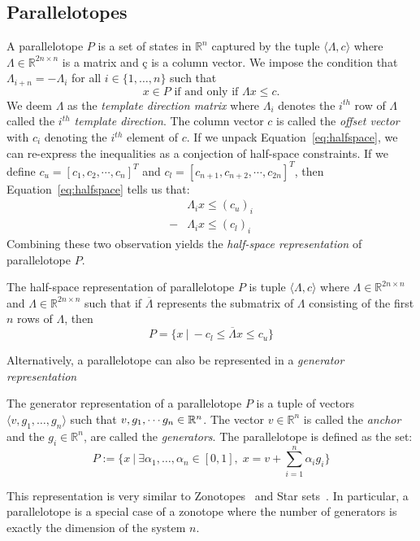 \subsection{Parallelotopes}
\label{sec:parallelotope}
A parallelotope $P$ is a set of states in $\mathbb{R}^{n}$ captured by the tuple $\langle \Lambda, c\rangle$ where $\Lambda \in \mathbb{R}^{2n \times n}$ is a matrix and $ç$ is a column vector. We impose the condition that $\Lambda_{i+n} = -\Lambda_{i}$ for all $i \in \{1, \ldots, n\}$ such that
%
\begin{equation}
\label{eq:halfspace}
x \in P \mbox{ if and only if } \Lambda x \leq c.
\end{equation}
We deem $\Lambda$ as the \emph{template direction matrix} where $\Lambda_i$ denotes the $i^{th}$ row of $\Lambda$ called the \emph{$i^{th}$ template direction}. The column vector $c$ is called the \emph{offset vector} with $c_i$ denoting the $i^{th}$ element of $c$.
%
If we unpack Equation~\ref{eq:halfspace}, we can re-express the inequalities as a conjection of half-space constraints. If we define $c_{u} = [c_1, c_2, \cdots, c_n]^T$ and $c_{l} = [c_{n+1}, c_{n+2}, \cdots, c_{2n}]^T$, then Equation~\ref{eq:halfspace} tells us that:
%
\begin{align*}
  & \Lambda_i x \leq (c_u)_i \\
  -& \Lambda_i x \leq (c_l)_i
\end{align*}
%
Combining these two observation yields the \emph{half-space representation} of parallelotope $P$.
%
\begin{definition}
The half-space representation of parallelotope $P$ is tuple  $\langle \Lambda, c\rangle$ where $\Lambda \in \mathbb{R}^{2n \times n}$ and $\Lambda \in \mathbb{R}^{2n \times n}$ such that if $\overline{\Lambda}$ represents the submatrix of $\Lambda$ consisting of the first $n$ rows of $\Lambda$, then
\begin{equation}
\label{eq:halfspaceconst}
P =\{x ~|~ -c_l \leq \overline{\Lambda} x \leq c_u\}
\end{equation}
\end{definition}
%
\noindent Alternatively, a parallelotope can also be represented in a \emph{generator representation}
%
\begin{definition}
The generator representation of a parallelotope $P$ is a tuple of vectors $\langle v, g_1, \ldots, g_n\rangle$ such that $v,g_1, \cdots g_n \in {\mathbb{R}}^n$. The vector  $v \in \mathbb{R}^n$ is called the \emph{anchor} and the $g_i \in \mathbb{R}^n$, are called the \emph{generators}. The parallelotope is defined as the set:
$$
P := \{ x ~|~ \exists \alpha_1, \ldots, \alpha_n \in [0,1], \; x = v + \sum_{i=1}^n \alpha_i g_i \}
$$
\end{definition}
%
\noindent This representation is very similar to Zonotopes~\cite{girard2005reachability,althoff2010computing} and Star sets~\cite{duggirala2016parsimonious}.
%
In particular, a parallelotope is a special case of a zonotope where the number of generators is exactly the dimension of the system $n$.

